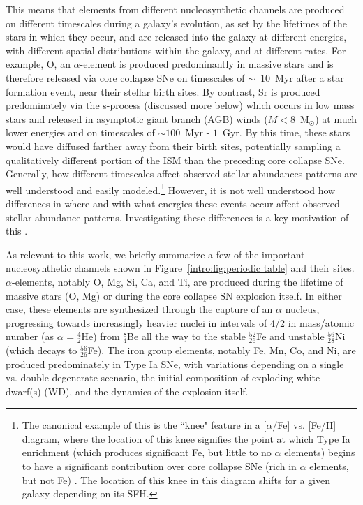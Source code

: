 This means that elements from different nucleosynthetic channels are produced on different timescales during a galaxy's evolution, as set by the lifetimes of the stars in which they occur, and are released into the galaxy at different energies, with different spatial distributions within the galaxy, and at different rates. For example, O, an $\alpha$-element is produced predominantly in massive stars and is therefore released via core collapse SNe on timescales of $\sim$~10~Myr after a star formation event, near their stellar birth sites. By contrast, Sr is produced predominately via the s-process (discussed more below) which occurs in low mass stars and released in asymptotic giant branch (AGB) winds ($M < 8$~M$_{\odot}$) at much lower energies and on timescales of $\sim 100$~Myr - $1$~Gyr. By this time, these stars would have diffused farther away from their birth sites, potentially sampling a qualitatively different portion of the ISM than the preceding core collapse SNe. Generally, how different timescales affect observed stellar abundances patterns are well understood and easily modeled.\footnote{The canonical example of this is the ``knee" feature in a $[\alpha/$Fe] vs. [Fe/H] diagram, where the location of this knee signifies the point at which Type Ia enrichment (which produces significant Fe, but little to no $\alpha$ elements) begins to have a significant contribution over core collapse SNe (rich in $\alpha$ elements, but not Fe) \citep[e.g.][]{MatteucciBrocato1990, Geisler2005, Hill2018}. The location of this knee in this diagram shifts for a given galaxy depending on its SFH.} However, it is not well understood how differences in where and with what energies these events occur affect observed stellar abundance patterns. Investigating these differences is a key motivation of this \Dissertation.

As relevant to this work, we briefly summarize a few of the important nucleosynthetic channels shown in Figure~\ref{intro:fig:periodic table} and their sites. $\alpha$-elements, notably O, Mg, Si, Ca, and Ti, are produced during the lifetime of massive stars (O, Mg) or during the core collapse SN explosion itself. In either case, these elements are synthesized through the capture of an $\alpha$ nucleus, progressing towards increasingly heavier nuclei in intervals of 4/2 in mass/atomic number (as $\alpha$ = $^{4}_2$He) from $^8_4$Be all the way to the stable $^{52}_{26}$Fe and unstable $^{56}_{28}$Ni (which decays to $^{56}_{26}$Fe). The iron group elements, notably Fe, Mn, Co, and Ni, are produced predominately in Type Ia SNe, with variations depending on a single vs. double degenerate scenario, the initial composition of exploding white dwarf(s) (WD), and the dynamics of the explosion itself.

